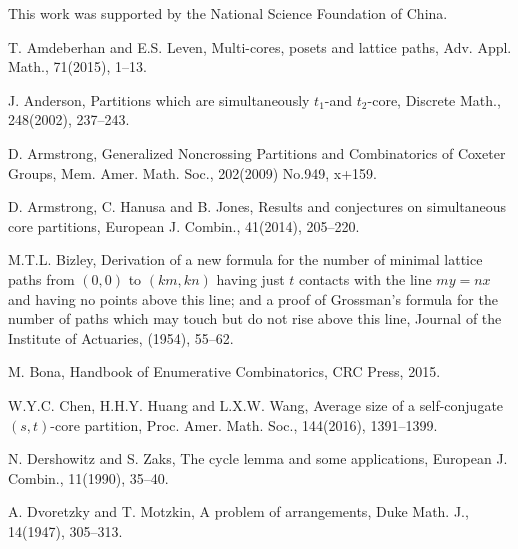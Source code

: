 \documentclass[a4paper,12pt]{article}
\begin{document}

\vspace{.2cm} 
This work was supported by the National Science Foundation of China.




\begin{thebibliography}{99}
T. Amdeberhan and E.S. Leven, Multi-cores, posets and lattice paths, Adv. Appl. Math., 71(2015), 1--13.

J. Anderson, Partitions which are simultaneously $t_1$-and $t_2$-core, Discrete Math., 248(2002), 237--243.

D. Armstrong, Generalized Noncrossing Partitions and Combinatorics of Coxeter Groups, Mem. Amer. Math. Soc., 202(2009) No.949, x+159.

D. Armstrong, C. Hanusa and B. Jones, Results and conjectures on simultaneous core partitions,  European J. Combin., 41(2014), 205--220.

M.T.L. Bizley,  Derivation of a new formula for the number of minimal lattice paths from $(0,0)$ to $(km, kn)$ having just $t$ contacts with the line $my= nx$ and having no points above this line; and a proof of Grossman's formula for the number of paths which may touch but do not rise above this line, Journal of the Institute of Actuaries, (1954), 55--62.

M. Bona, Handbook of Enumerative Combinatorics, CRC Press, 2015.


W.Y.C. Chen, H.H.Y. Huang and L.X.W. Wang, Average size of a self-conjugate $(s,t)$-core partition,  Proc. Amer. Math. Soc., 144(2016), 1391--1399.

N. Dershowitz and S. Zaks, The cycle lemma and some applications, European J. Combin., 11(1990), 35--40.

A. Dvoretzky and T. Motzkin, A problem of arrangements, Duke Math. J., 14(1947),  305--313.


\end{thebibliography}
\end{document}
